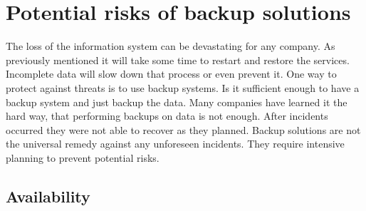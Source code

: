 \documentclass[12pt]{article}
\begin{document}
\section{Potential risks of backup solutions}
The loss of the information system can be devastating for any company. As previously mentioned it will take some time to restart and restore the services. Incomplete data will slow down that process or even prevent it.  One way to protect against threats is to use backup systems. Is it sufficient enough to have a backup system and just backup the data. Many companies have learned it the hard way, that performing backups on data is not enough. After incidents occurred they were not able to recover as they planned. 
\newline
\newline
Backup solutions are not the universal remedy against any unforeseen  incidents. They require intensive planning to prevent potential risks. 
\subsection{Availability}
\end{document}
